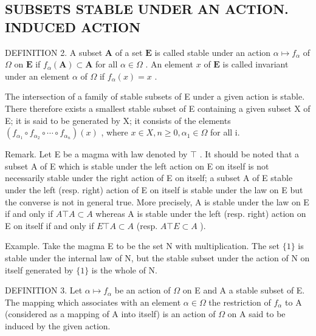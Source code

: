 \subsection{SUBSETS STABLE UNDER AN ACTION. INDUCED ACTION}

DEFINITION 2. A subset \(\mathbf{A}\) of a set \(\mathbf{E}\) is called stable under an action \(\alpha \mapsto f_{\alpha}\) of \(\Omega\) on \(\mathbf{E}\) if \(f_{\alpha}(\mathbf{A}) \subset \mathbf{A}\) for all \(\alpha \in \Omega\) . An element \(x\) of \(\mathbf{E}\) is called invariant under an element \(\alpha\) of \(\Omega\) if \(f_{\alpha}(x) = x\) .

The intersection of a family of stable subsets of E under a given action is stable. There therefore exists a smallest stable subset of E containing a given subset X of E; it is said to be generated by X; it consists of the elements \((f_{\alpha_{1}} \circ f_{\alpha_{2}} \circ \cdots \circ f_{\alpha_{n}})(x)\) , where \(x \in X, n \geqslant 0, \alpha_{1} \in \Omega\) for all i.

Remark. Let E be a magma with law denoted by \(\top\) . It should be noted that a subset A of E which is stable under the left action on E on itself is not necessarily stable under the right action of E on itself; a subset A of E stable under the left (resp. right) action of E on itself is stable under the law on E but the converse is not in general true. More precisely, A is stable under the law on E if and only if \(A \top A \subset A\) whereas A is stable under the left (resp. right) action on E on itself if and only if \(E \top A \subset A\) (resp. \(A \top E \subset A\) ).

Example. Take the magma E to be the set N with multiplication. The set \(\{1\}\) is stable under the internal law of N, but the stable subset under the action of N on itself generated by \(\{1\}\) is the whole of N.

DEFINITION 3. Let \(\alpha \mapsto f_{\alpha}\) be an action of \(\Omega\) on E and A a stable subset of E. The mapping which associates with an element \(\alpha \in \Omega\) the restriction of \(f_{\alpha}\) to A (considered as a mapping of A into itself) is an action of \(\Omega\) on A said to be induced by the given action.


